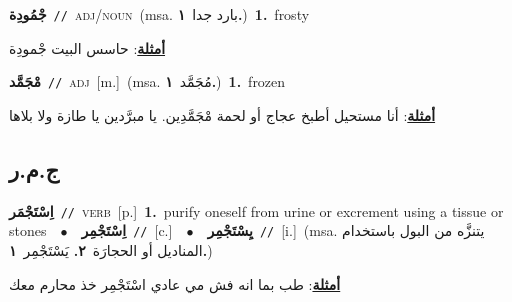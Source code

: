 \documentclass[10pt,a4paper,twoside]{article} %
\begin{document}
\begin{multicols}{2}
{\setlength\topsep{0pt}\textbf{\foreignlanguage{arabic}{جْمُودِة}}\ {\color{gray}\texttt{//}\color{black}}\ \textsc{adj/noun}\ \color{gray}(msa. \foreignlanguage{arabic}{بارد جدا}~\foreignlanguage{arabic}{\textbf{١.}})\color{black}\ \textbf{1.}~frosty\  \begin{flushright}\color{gray}\foreignlanguage{arabic}{\textbf{\underline{\foreignlanguage{arabic}{أمثلة}}}: حاسس البيت جْمودِة}\end{flushright}\color{black}} \vspace{2mm}

{\setlength\topsep{0pt}\textbf{\foreignlanguage{arabic}{مْجَمَّد}}\ {\color{gray}\texttt{//}\color{black}}\ \textsc{adj}\ [m.]\ \color{gray}(msa. \foreignlanguage{arabic}{مُجَمَّد}~\foreignlanguage{arabic}{\textbf{١.}})\color{black}\ \textbf{1.}~frozen\  \begin{flushright}\color{gray}\foreignlanguage{arabic}{\textbf{\underline{\foreignlanguage{arabic}{أمثلة}}}: أنا مستحيل أطبخ عجاج أو لحمة مْجَمَّدِين. يا مبرَّدين يا طازة ولا بلاها}\end{flushright}\color{black}} \vspace{2mm}

\vspace{-3mm}
\subsection*{\color{blue}\foreignlanguage{arabic}{ج.م.ر}\color{blue}{}} 

{\setlength\topsep{0pt}\textbf{\foreignlanguage{arabic}{اِسْتَجْمَر}}\ {\color{gray}\texttt{//}\color{black}}\ \textsc{verb}\ [p.]\ \textbf{1.}~purify oneself from urine or excrement using a tissue or stones\ \ $\bullet$\ \ \setlength\topsep{0pt}\textbf{\foreignlanguage{arabic}{اِسْتَجْمِر}}\ {\color{gray}\texttt{//}\color{black}}\ [c.]\ \ $\bullet$\ \ \setlength\topsep{0pt}\textbf{\foreignlanguage{arabic}{يِسْتَجْمِر}}\ {\color{gray}\texttt{//}\color{black}}\ [i.]\ \color{gray}(msa. \foreignlanguage{arabic}{يتنزَّه من البول باستخدام المناديل أو الحجارَة}~\foreignlanguage{arabic}{\textbf{٢.}}  \foreignlanguage{arabic}{يَسْتَجْمِر}~\foreignlanguage{arabic}{\textbf{١.}})\color{black}\  \begin{flushright}\color{gray}\foreignlanguage{arabic}{\textbf{\underline{\foreignlanguage{arabic}{أمثلة}}}: طب بما انه فش مي عادي اسْتَجْمِر خذ محارم معك}\end{flushright}\color{black}} \vspace{2mm}


\end{multicols}
\end{document}
